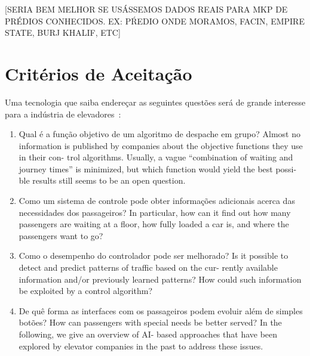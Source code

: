 {\color{red}[SERIA BEM MELHOR SE USÁSSEMOS DADOS REAIS PARA MKP DE PRÉDIOS CONHECIDOS. EX: PŔEDIO ONDE MORAMOS, FACIN, EMPIRE STATE, BURJ KHALIF, ETC]} %

\section{Critérios de Aceitação}

Uma tecnologia que saiba endereçar as seguintes questões será de grande interesse para a indústria de elevadores~\cite{KOEHLEROTTIGER02}:

\begin{enumerate}
\item Qual é a função objetivo de um algoritmo de despache em grupo? \hfill \newline
      Almost no information is published by companies about the objective functions they use in their con- trol algorithms. Usually, a vague “combination of waiting and journey times” is minimized, but which function would yield the best possi- ble results still seems to be an open question.

\item Como um sistema de controle pode obter informações adicionais acerca das necessidades dos passageiros?\hfill \newline
      In particular, how can it find out how many passengers are waiting at a floor, how fully loaded a car is, and where the passengers want to go?

\item Como o desempenho do controlador pode ser melhorado? \hfill \newline
      Is it possible to detect and predict patterns of traffic based on the cur- rently available information and/or previously learned patterns? How could such information be exploited by a control algorithm?

\item De quê forma as interfaces com os passageiros podem evoluir além de simples botões? \hfill \newline
      How can passengers with special needs be better served? In the following, we give an overview of AI- based approaches that have been explored by elevator companies in the past to address these issues.
\end{enumerate}